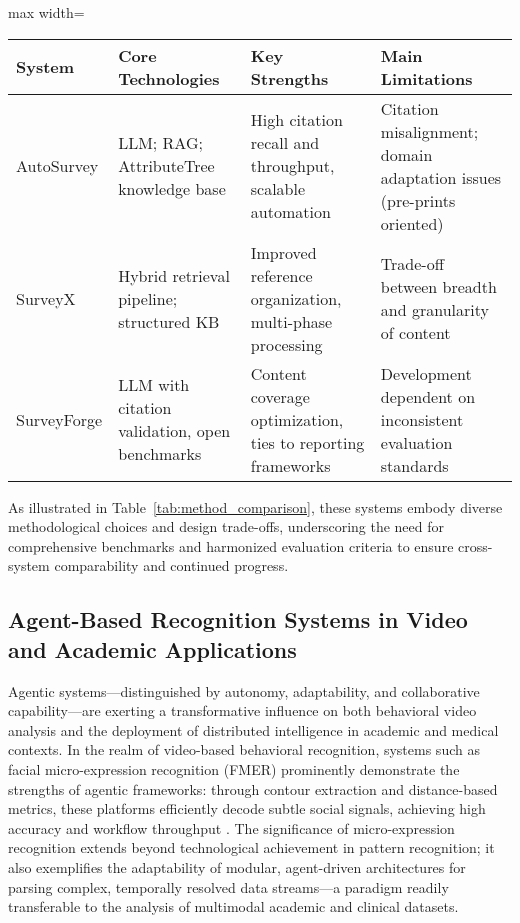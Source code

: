 \begin{table*}[htbp]
\centering
\caption{Comparison of Leading AI-Driven Survey Automation Systems}
\label{tab:method_comparison}
\begin{adjustbox}{max width=\textwidth}
\begin{tabular}{@{}llll@{}}
\toprule
System & Core Technologies & Key Strengths & Main Limitations \\
\midrule
AutoSurvey & LLM; RAG; AttributeTree knowledge base & High citation recall and throughput, scalable automation & Citation misalignment; domain adaptation issues (pre-prints oriented) \\
SurveyX    & Hybrid retrieval pipeline; structured KB & Improved reference organization, multi-phase processing & Trade-off between breadth and granularity of content \\
SurveyForge & LLM with citation validation, open benchmarks & Content coverage optimization, ties to reporting frameworks & Development dependent on inconsistent evaluation standards \\
\bottomrule
\end{tabular}
\end{adjustbox}
\end{table*}

As illustrated in Table~\ref{tab:method_comparison}, these systems embody diverse methodological choices and design trade-offs, underscoring the need for comprehensive benchmarks and harmonized evaluation criteria to ensure cross-system comparability and continued progress.

\subsection{Agent-Based Recognition Systems in Video and Academic Applications}

Agentic systems—distinguished by autonomy, adaptability, and collaborative capability—are exerting a transformative influence on both behavioral video analysis and the deployment of distributed intelligence in academic and medical contexts. In the realm of video-based behavioral recognition, systems such as facial micro-expression recognition (FMER) prominently demonstrate the strengths of agentic frameworks: through contour extraction and distance-based metrics, these platforms efficiently decode subtle social signals, achieving high accuracy and workflow throughput \cite{ref116}. The significance of micro-expression recognition extends beyond technological achievement in pattern recognition; it also exemplifies the adaptability of modular, agent-driven architectures for parsing complex, temporally resolved data streams—a paradigm readily transferable to the analysis of multimodal academic and clinical datasets.

